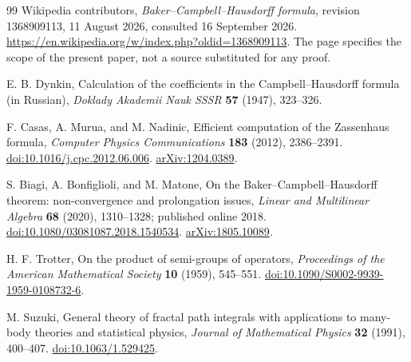 \documentclass[11pt]{article}
\numberwithin{equation}{section}
\theoremstyle{definition}
\theoremstyle{remark}
\begin{document}
\clearpage
\begin{thebibliography}{99}
Wikipedia contributors,
\emph{Baker--Campbell--Hausdorff formula}, revision 1368909113,
11 August 2026, consulted 16 September 2026.
\url{https://en.wikipedia.org/w/index.php?oldid=1368909113}.
The page specifies the scope of the present paper, not a source
substituted for any proof.

E. B. Dynkin,
Calculation of the coefficients in the Campbell--Hausdorff formula
(in Russian),
\emph{Doklady Akademii Nauk SSSR} \textbf{57} (1947), 323--326.

F. Casas, A. Murua, and M. Nadinic,
Efficient computation of the Zassenhaus formula,
\emph{Computer Physics Communications} \textbf{183} (2012),
2386--2391.
\href{https://doi.org/10.1016/j.cpc.2012.06.006}{doi:10.1016/j.cpc.2012.06.006}.
\href{https://arxiv.org/abs/1204.0389}{arXiv:1204.0389}.

S. Biagi, A. Bonfiglioli, and M. Matone,
On the Baker--Campbell--Hausdorff theorem: non-convergence and
prolongation issues,
\emph{Linear and Multilinear Algebra} \textbf{68} (2020),
1310--1328; published online 2018.
\href{https://doi.org/10.1080/03081087.2018.1540534}{doi:10.1080/03081087.2018.1540534}.
\href{https://arxiv.org/abs/1805.10089}{arXiv:1805.10089}.

H. F. Trotter,
On the product of semi-groups of operators,
\emph{Proceedings of the American Mathematical Society}
\textbf{10} (1959), 545--551.
\href{https://doi.org/10.1090/S0002-9939-1959-0108732-6}{doi:10.1090/S0002-9939-1959-0108732-6}.

M. Suzuki,
General theory of fractal path integrals with applications to
many-body theories and statistical physics,
\emph{Journal of Mathematical Physics} \textbf{32} (1991),
400--407.
\href{https://doi.org/10.1063/1.529425}{doi:10.1063/1.529425}.
\end{thebibliography}
\end{document}
